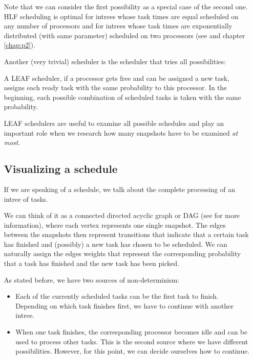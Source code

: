 Note that we can consider the first possibility as a special case of the second one. HLF scheduling is optimal for intrees whose task times are equal scheduled on any number of processors \cite{hu:1961:hlfoptimalforknowntimesintree} and for intrees whose task times are exponentially distributed (with same parameter) scheduled on two processors (see \cite{chandyreynoldsshortpaper1975} and chapter \ref{chap:p2}). 

Another (very trivial) scheduler is the scheduler that tries all possibilities:

\begin{definition}
  A LEAF scheduler, if a processor gets free and can be assigned a new task, assigns each ready task with the same probability to this processor. In the beginning, each possible combination of scheduled tasks is taken with the same probability.
\end{definition}

LEAF schedulers are useful to examine all possible schedules and play an important role when we research how many snapshots have to be examined \emph{at most}.

\subsection{Visualizing a schedule}
\label{sec:intro-visualizing-schedules}

If we are speaking of a schedule, we talk about the complete processing of an intree of tasks.

We can think of it as a connected directed acyclic graph or DAG (see \cite{diestel2005graph} for more information), where each vertex represents one single snapshot. The edges between the snapshots then represent transitions that indicate that a certain task has finished and (possibly) a new task has chosen to be scheduled. We can naturally assign the edges weights that represent the corresponding probability that a task has finished and the new task has been picked.

As stated before, we have two sources of non-determinism:
\begin{itemize}
\item Each of the currently scheduled tasks can be the first task to finish. Depending on which task finishes first, we have to continue with another intree.
\item When one task finishes, the corresponding processor becomes idle and can be used to process other tasks. This is the second source where we have different possibilities. However, for this point, we can decide ourselves how to continue.
\end{itemize}


